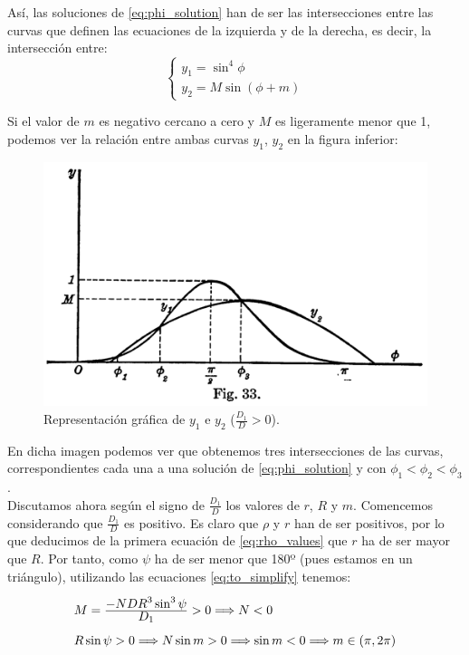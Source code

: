 \documentclass[11pt]{article}
\newcommand\ddfrac[2]{\frac{\displaystyle #1}{\displaystyle #2}}
\begin{document}
Así, las soluciones de \eqref{eq:phi_solution} han de ser las intersecciones entre las curvas que definen las ecuaciones de la izquierda y de la derecha, es decir, la intersección entre:
\[
\left\{
\begin{array}{l}
y_1=\sin^4{\phi}\\
y_2=M\sin{(\phi+m)}
\end{array}
\right.
\]

Si el valor de $m$ es negativo cercano a cero y $M$ es ligeramente menor que 1, podemos ver la relación entre ambas curvas $y_1$, $y_2$ en la figura inferior:

\begin{figure}[H]
\centering
\includegraphics[scale=0.5]{images/fig_33.png}
\caption{Representación gráfica de $y_1$ e $y_2$ ($\frac{D_1}{D}>0$).}
\label{fig:y1_y2_graph_positive}
\end{figure}

En dicha imagen podemos ver que obtenemos tres intersecciones de las curvas, correspondientes cada una a una solución de \eqref{eq:phi_solution} y con $\phi_1<\phi_2<\phi_3$.\\

Discutamos ahora según el signo de $\frac{D_1}{D}$ los valores de $r$, $R$ y $m$. Comencemos considerando que $\frac{D_1}{D}$ es positivo. Es claro que $\rho$ y $r$ han de ser positivos, por lo que deducimos de la primera ecuación de \eqref{eq:rho_values} que $r$ ha de ser mayor que $R$. Por tanto, como $\psi$ ha de ser menor que 180º (pues estamos en un triángulo), utilizando las ecuaciones \eqref{eq:to_simplify} tenemos:
\[
\def\arraystretch{2}
\begin{array}{l}
M=\ddfrac{-NDR^3\sin^3{\psi}}{D_1}>0 \Longrightarrow N<0 \\
R\sin{\psi}>0 \Longrightarrow N\sin{m}>0 \Longrightarrow \sin{m}<0 \Longrightarrow m\in(\pi,2\pi)
\end{array}
\]
\end{document}
